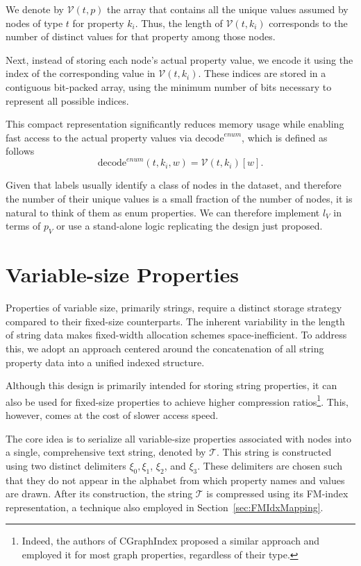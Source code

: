 We denote by $\mathcal{V}(t, p)$ the array that contains all the unique values assumed by nodes of type $t$ for property $k_i$. Thus, the length of $\mathcal{V}(t, k_i)$ corresponds to the number of distinct values for that property among those nodes.

Next, instead of storing each node's actual property value, we encode it using the index of the corresponding value in $\mathcal{V}(t, k_i)$. These indices are stored in a contiguous bit-packed array, using the minimum number of bits necessary to represent all possible indices.

This compact representation significantly reduces memory usage while enabling fast access to the actual property values via $\mathrm{decode}^{enum}$, which is defined as follows
\[
\mathrm{decode}^{enum}(t, k_i, w) = \mathcal V (t, k_i)[w].
\]

Given that labels usually identify a class of nodes in the dataset, and therefore the number of their unique values is a small fraction of the number of nodes, it is natural to think of them as enum properties. We can therefore implement $l_V$ in terms of $p_V$ or use a stand-alone logic replicating the design just proposed.


\section{Variable-size Properties}

Properties of variable size, primarily strings, require a distinct storage strategy compared to their fixed-size counterparts. The inherent variability in the length of string data makes fixed-width allocation schemes space-inefficient. To address this, we adopt an approach centered around the concatenation of all string property data into a unified indexed structure.

Although this design is primarily intended for storing string properties, it can also be used for fixed-size properties to achieve higher compression ratios\footnote{Indeed, the authors of CGraphIndex proposed a similar approach and employed it for most graph properties, regardless of their type.}. This, however, comes at the cost of slower access speed.

The core idea is to serialize all variable-size properties associated with nodes into a single, comprehensive text string, denoted by $\mathcal{T}$. This string is constructed using two distinct delimiters $\xi_0, \xi_1$, $\xi_2$, and $\xi_3$. These delimiters are chosen such that they do not appear in the alphabet from which property names and values are drawn. After its construction, the string $\mathcal{T}$ is compressed using its FM-index representation, a technique also employed in Section~\ref{sec:FMIdxMapping}.

